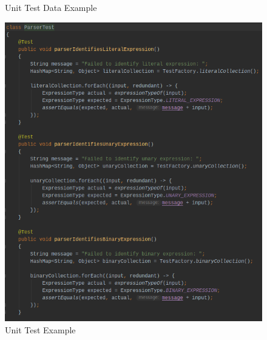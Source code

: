 \documentclass[
]{report}
\begin{document}
\begin{appendices}
\begin{figure}
		\caption{Unit Test Data Example}
		\label{fig:test-data-example}
	\end{figure}
	\begin{figure}
		\centering
		\includegraphics[width=\textwidth]{test-example}
		\caption{Unit Test Example}
		\label{fig:test-example}
	\end{figure}

\end{appendices}
\end{document}
